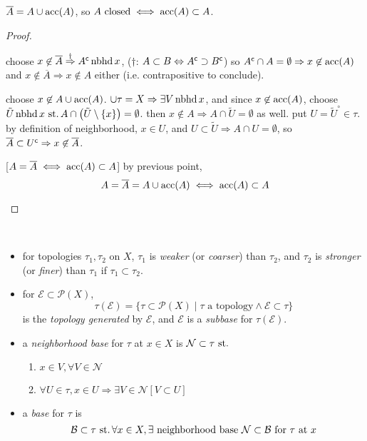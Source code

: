 \begin{prop}\label{prop:4.1}\label{prop:04:acc-char}
  ${\overline{A}=A\cup\operatorname{acc}(A)}$, so
  ${A\text{ closed}\iff\operatorname{acc}(A)\subset A}$.
\end{prop}
\begin{proof}\ 
  \begin{description}
  \item[(${A\cup\acc(A)\subset\overline{A}}$)]
    choose
    ${x\not\in\overline{A} \stackrel{\dag}{\Rightarrow} {A}^{\mathsf{c}}\operatorname{nbhd} x}$,
    ($\dag$: ${A\subset B\Leftrightarrow {A}^{\mathsf{c}}\supset{B}^{\mathsf{c}}}$)
    so
    ${{A}^{\mathsf{c}}\cap A=\emptyset\Rightarrow x\not\in\operatorname{acc}(A)}$
    and
    ${x\not\in\overline{A}\Rightarrow x\not\in A}$ either
    (i.e. contrapositive to conclude).
  \item[(${\overline{A}\subset A\cup\acc(A)}$)]
    choose ${x\not\in A\cup\operatorname{acc}(A)}$.
    ${\cup\tau = X \Rightarrow\exists V\operatorname{nbhd} x}$, and since
    ${x\not\in\operatorname{acc}(A)}$, choose
    ${\tilde{U}\operatorname{nbhd} x\operatorname{\,st.} A\cap\big(\tilde{U}\setminus\{x\}\big)=\emptyset}$.
    then ${x\not\in A\Rightarrow A\cap\tilde{U}=\emptyset}$ as well.
    put ${U=\tilde{U}^\circ\in\tau}$.
    by definition of neighborhood, ${x\in U}$, and
    ${U\subset\tilde{U}\Rightarrow A\cap U=\emptyset}$,
    so
    ${\overline{A}\subset{U}^{\mathsf{c}}\Rightarrow x\not\in\overline{A}}$.
  \item{[${A=\overline{A}\iff\operatorname{acc}(A)\subset A}$]}
    by previous point,
    \[ A=\overline{A}=A\cup\operatorname{acc}(A)\iff \operatorname{acc}(A)\subset A \]
  \end{description}
\end{proof}

\begin{defn}\ 
  \begin{itemize}
  \item for topologies ${\tau_1,\tau_2}$ on $X$,
    $\tau_1$ is \emph{weaker} (or \emph{coarser}) than $\tau_2$, and
    $\tau_2$ is \emph{stronger} (or \emph{finer}) than $\tau_1$
    if ${\tau_1\subset\tau_2}$.
  \item for ${\mathcal{E}\subset\mathscr{P}(X)}$,
    \[
    \tau(\mathcal{E}) = \{\tau\subset \mathscr{P}(X)\mid
    \tau\text{ a topology}\land\mathcal{E}\subset\tau\}
    \]
    is the \emph{topology generated} by $\mathcal{E}$, and
    $\mathcal{E}$ is a \emph{subbase} for $\tau(\mathcal{E})$.
  \item a \emph{neighborhood base} for $\tau$ at ${x\in X}$
    is ${\mathcal{N}\subset\tau\operatorname{\,st.}}$
    \begin{enumerate}[label=(\arabic*)]
    \item\label{defn:04:nbhd-base:itm:01}
      ${x\in V,\forall V\in\mathcal{N}}$
    \item\label{defn:04:nbhd-base:itm:02}
      ${\forall U\in\tau, x\in U\Rightarrow \exists V\in\mathcal{N}[V\subset U]}$
    \end{enumerate}
  \item a \emph{base} for $\tau$ is
    \[
    \mathcal{B}\subset\tau\operatorname{\,st.}
    \forall x\in X,\exists\text{ neighborhood base }\mathcal{N}\subset
    \mathcal{B}\text{ for }\tau\text{ at } x
    \]
  \end{itemize}
\end{defn}

